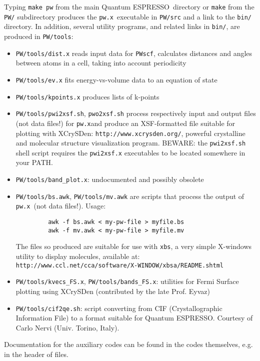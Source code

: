 \documentclass[12pt,a4paper]{article}
\def\PWscf{\texttt{PWscf}}
\def\qe{{\sc Quantum ESPRESSO}}
\def\pwx{\texttt{pw.x}}
\begin{document}
Typing \texttt{make pw} from the main \qe\ directory or
\texttt{make} from the \texttt{PW/} subdirectory produces
the \pwx\ executable in \texttt{PW/src} and a link to the
\texttt{bin/} directory. In addition, several utility
programs, and related links in \texttt{bin/}, are produced 
in \texttt{PW/tools}:

\begin{itemize}
\item  \texttt{PW/tools/dist.x} reads input data for \PWscf,
calculates distances and angles between atoms in a cell,
taking into account periodicity 
\item  \texttt{PW/tools/ev.x} fits energy-vs-volume data to an equation of state
\item  \texttt{PW/tools/kpoints.x} produces lists of k-points
\item  \texttt{PW/tools/pwi2xsf.sh},  \texttt{pwo2xsf.sh} process respectively input and output
  files (not data files!) for \pwx and produce an XSF-formatted file
  suitable for plotting with XCrySDen:
  \texttt{http://www.xcrysden.org/},  powerful crystalline and
  molecular structure visualization program.
  BEWARE: the  \texttt{pwi2xsf.sh} shell script
  requires the  \texttt{pwi2xsf.x} executables to be located somewhere in your PATH. 
\item  \texttt{PW/tools/band\_plot.x}: undocumented and possibly obsolete 
\item  \texttt{PW/tools/bs.awk},  \texttt{PW/tools/mv.awk} are scripts that process the output of \pwx\ (not
data files!). Usage: 
\begin{verbatim}
         awk -f bs.awk < my-pw-file > myfile.bs
         awk -f mv.awk < my-pw-file > myfile.mv
\end{verbatim}
The files so produced are suitable for use with  \texttt{xbs}, a very simple
X-windows utility to display molecules, available at:\\
 \texttt{http://www.ccl.net/cca/software/X-WINDOW/xbsa/README.shtml}
\item  \texttt{PW/tools/kvecs\_FS.x},  \texttt{PW/tools/bands\_FS.x}: utilities for Fermi Surface plotting
  using XCrySDen (contributed by the late Prof. Eyvaz)
\item  \texttt{PW/tools/cif2qe.sh}: script converting from CIF 
(Crystallographic Information File) to a format suitable for \qe.
Courtesy of Carlo Nervi (Univ. Torino, Italy).
\end{itemize}
Documentation for the auxiliary codes can be found in the codes
themselves, e.g. in the header of files.
\end{document}
